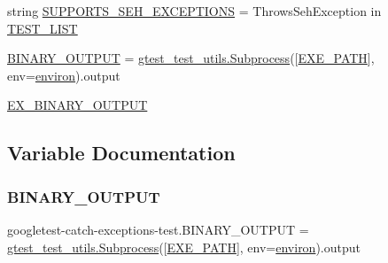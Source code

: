 \begin{DoxyCompactItemize}
string \mbox{\hyperlink{namespacegoogletest-catch-exceptions-test_ae72da371134ddf921c9edf36788f7ecd}{S\+U\+P\+P\+O\+R\+T\+S\+\_\+\+S\+E\+H\+\_\+\+E\+X\+C\+E\+P\+T\+I\+O\+NS}} = \textquotesingle{}Throws\+Seh\+Exception\textquotesingle{} in \mbox{\hyperlink{namespacegoogletest-catch-exceptions-test_a8002b73eafb58268e677846819651377}{T\+E\+S\+T\+\_\+\+L\+I\+ST}}
\item 
\mbox{\hyperlink{namespacegoogletest-catch-exceptions-test_ac02efc4cd44ac24ba2c8d34a0e787693}{B\+I\+N\+A\+R\+Y\+\_\+\+O\+U\+T\+P\+UT}} = \mbox{\hyperlink{classgtest__test__utils_1_1Subprocess}{gtest\+\_\+test\+\_\+utils.\+Subprocess}}(\mbox{[}\mbox{\hyperlink{namespacegoogletest-catch-exceptions-test_a188751df0f5c5c09a9cbb394ef711725}{E\+X\+E\+\_\+\+P\+A\+TH}}\mbox{]}, env=\mbox{\hyperlink{namespacegoogletest-catch-exceptions-test_ac016f17c70e0883eb6b14abcfaf5da44}{environ}}).output
\item 
\mbox{\hyperlink{namespacegoogletest-catch-exceptions-test_a291a1ed9c774889e37aab2e7a526fc80}{E\+X\+\_\+\+B\+I\+N\+A\+R\+Y\+\_\+\+O\+U\+T\+P\+UT}}
\end{DoxyCompactItemize}


\subsection{Variable Documentation}
\mbox{\label{namespacegoogletest-catch-exceptions-test_ac02efc4cd44ac24ba2c8d34a0e787693}} 
\subsubsection{\texorpdfstring{BINARY\_OUTPUT}{BINARY\_OUTPUT}}
{\footnotesize\ttfamily googletest-\/catch-\/exceptions-\/test.\+B\+I\+N\+A\+R\+Y\+\_\+\+O\+U\+T\+P\+UT = \mbox{\hyperlink{classgtest__test__utils_1_1Subprocess}{gtest\+\_\+test\+\_\+utils.\+Subprocess}}(\mbox{[}\mbox{\hyperlink{namespacegoogletest-catch-exceptions-test_a188751df0f5c5c09a9cbb394ef711725}{E\+X\+E\+\_\+\+P\+A\+TH}}\mbox{]}, env=\mbox{\hyperlink{namespacegoogletest-catch-exceptions-test_ac016f17c70e0883eb6b14abcfaf5da44}{environ}}).output}

\mbox{\label{namespacegoogletest-catch-exceptions-test_ac016f17c70e0883eb6b14abcfaf5da44}} 
